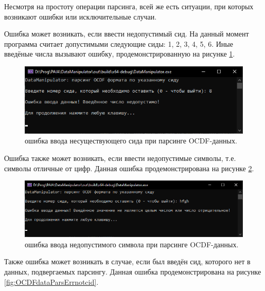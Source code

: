 {\standartFont

  \par Несмотря на простоту операции парсинга, всей же есть ситуации, при которых возникают ошибки или исключительные случаи. 

  \par Ошибка может возникать, если ввести недопустимый сид. На данный момент программа считает допустимыми следующие сиды: 1, 2, 3, 4, 5, 6. Иные введёные числа вызывают ошибку, продемонстрированную на рисунке \ref{fig:OCDFdataParsErrUnkcid}.

  \begin{figure}[H]
    \centering
    \includegraphics{images/forDataManipulator/OCDFdataParsErrUnknowCID.png}
    \caption{ошибка ввода несуществующего сида при парсинге OCDF-данных.} 
    \label{fig:OCDFdataParsErrUnkcid}
  \end{figure}

  \par Ошибка также может возникать, если ввести недопустимые символы, т.е. символы отличные от цифр. Данная ошибка продемонстрирована на рисунке \ref{fig:OCDFdataParsErrInv}.

  \begin{figure}[H]
    \centering
    \includegraphics[width=\textwidth]{images/forDataManipulator/OCDFdataParsErrInvalid.png}
    \caption{ошибка ввода недопустимого символа при парсинге OCDF-данных.} 
    \label{fig:OCDFdataParsErrInv}
  \end{figure}

  \par Также ошибка может возникать в случае, если был введён сид, которого нет в данных, подвергаемых парсингу. Данная ошибка продемонстрирована на рисунке \ref{fig:OCDFdataParsErrnotcid}.

}
